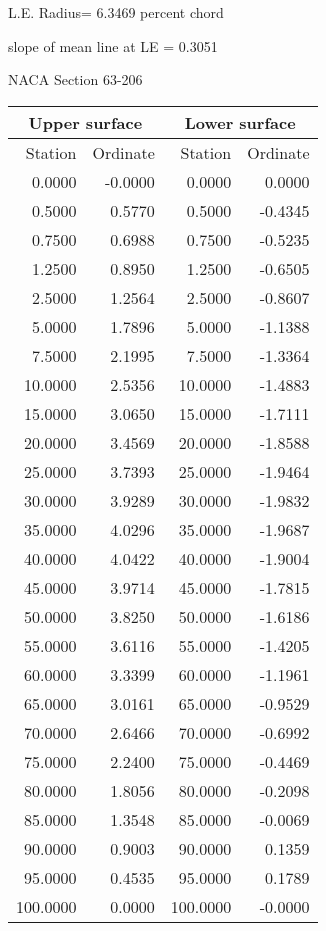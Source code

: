 \documentclass[11pt]{book}
\begin{document}
L.E. Radius=  6.3469 percent chord


 slope of mean line at LE =  0.3051
 \newpage
  \label{s63-206}
 \begin{Large}
 NACA Section 63-206
 \end{Large}
  
 \vspace{8mm}
 \begin{tabular}{|r|r|r|r|} \hline 
 \multicolumn{2}{|c|}{Upper surface} & \multicolumn{2}{|c|}{Lower surface} \\
 \hline
 Station & Ordinate & Station & Ordinate \\
 \hline
0.0000 & -0.0000 & 0.0000 & 0.0000 \\
0.5000 & 0.5770 & 0.5000 & -0.4345 \\
0.7500 & 0.6988 & 0.7500 & -0.5235 \\
1.2500 & 0.8950 & 1.2500 & -0.6505 \\
2.5000 & 1.2564 & 2.5000 & -0.8607 \\
5.0000 & 1.7896 & 5.0000 & -1.1388 \\
7.5000 & 2.1995 & 7.5000 & -1.3364 \\
10.0000 & 2.5356 & 10.0000 & -1.4883 \\
15.0000 & 3.0650 & 15.0000 & -1.7111 \\
20.0000 & 3.4569 & 20.0000 & -1.8588 \\
25.0000 & 3.7393 & 25.0000 & -1.9464 \\
30.0000 & 3.9289 & 30.0000 & -1.9832 \\
35.0000 & 4.0296 & 35.0000 & -1.9687 \\
40.0000 & 4.0422 & 40.0000 & -1.9004 \\
45.0000 & 3.9714 & 45.0000 & -1.7815 \\
50.0000 & 3.8250 & 50.0000 & -1.6186 \\
55.0000 & 3.6116 & 55.0000 & -1.4205 \\
60.0000 & 3.3399 & 60.0000 & -1.1961 \\
65.0000 & 3.0161 & 65.0000 & -0.9529 \\
70.0000 & 2.6466 & 70.0000 & -0.6992 \\
75.0000 & 2.2400 & 75.0000 & -0.4469 \\
80.0000 & 1.8056 & 80.0000 & -0.2098 \\
85.0000 & 1.3548 & 85.0000 & -0.0069 \\
90.0000 & 0.9003 & 90.0000 & 0.1359 \\
95.0000 & 0.4535 & 95.0000 & 0.1789 \\
100.0000 & 0.0000 & 100.0000 & -0.0000 \\
 \hline 
 \end{tabular}
\end{document}
